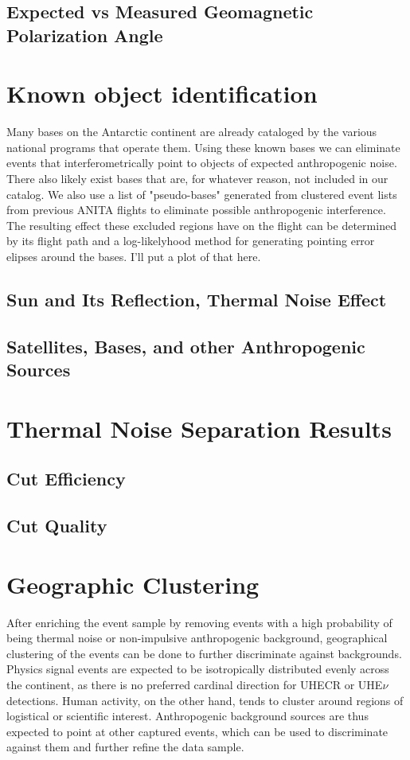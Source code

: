 	\subsection{Expected vs Measured Geomagnetic Polarization Angle}
	
\section{Known object identification}
	Many bases on the Antarctic continent are already cataloged by the various national programs that operate them.  Using these known bases we can eliminate events that interferometrically point to objects of expected anthropogenic noise.  There also likely exist bases that are, for whatever reason, not included in our catalog.  We also use a list of "pseudo-bases" generated from clustered event lists from previous ANITA flights to eliminate possible anthropogenic interference.  The resulting effect these excluded regions have on the flight can be determined by its flight path and a log-likelyhood method for generating pointing error elipses around the bases.  I'll put a plot of that here.
	\subsection{Sun and Its Reflection, Thermal Noise Effect}
	\subsection{Satellites, Bases, and other Anthropogenic Sources}

\section{Thermal Noise Separation Results}
	\subsection{Cut Efficiency}
	\subsection{Cut Quality}




\section{Geographic Clustering}
	After enriching the event sample by removing events with a high probability of being thermal noise or non-impulsive anthropogenic background, geographical clustering of the events can be done to further discriminate against backgrounds. Physics signal events are expected to be isotropically distributed evenly across the continent, as there is no preferred cardinal direction for UHECR or UHE$\nu$ detections.  Human activity, on the other hand, tends to cluster around regions of logistical or scientific interest.  Anthropogenic background sources are thus expected to point at other captured events, which can be used to discriminate against them and further refine the data sample. 

